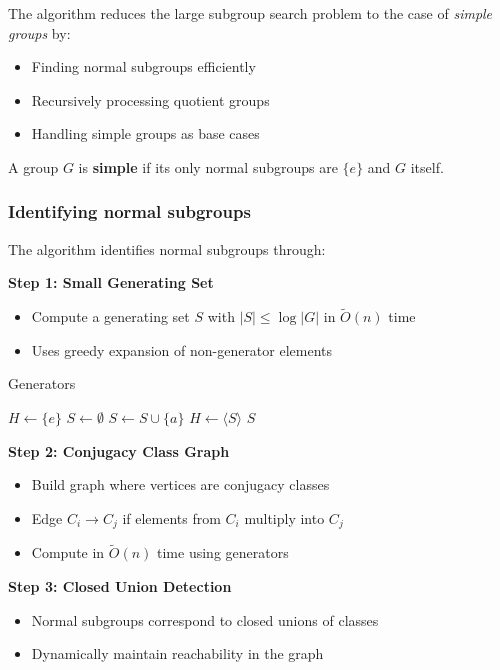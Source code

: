 \documentclass[sigconf]{acmart}
\begin{document}
The algorithm reduces the large subgroup search problem to the case of \emph{simple groups} by:
\begin{itemize}
    \item Finding normal subgroups efficiently
    \item Recursively processing quotient groups
    \item Handling simple groups as base cases
\end{itemize}

\begin{definition}
A group \( G \) is \textbf{simple} if its only normal subgroups are \( \{e\} \) and \( G \) itself.
\end{definition}

\subsubsection{Identifying normal subgroups}
The algorithm identifies normal subgroups through:

\textbf{Step 1: Small Generating Set}
\begin{itemize}
    \item Compute a generating set \( S \) with \( |S| \leq \log|G| \) in \( \widetilde{O}(n) \) time
    \item Uses greedy expansion of non-generator elements
\end{itemize}

\begin{algorithm}[H]
\caption{Generators}
\begin{algorithmic}[1]
\STATE \( H \gets \{e\} \)
\STATE \( S \gets \emptyset \)
        \STATE \( S \gets S \cup \{a\} \)
        \STATE \( H \gets \langle S \rangle \)
    \ENDIF
\ENDFOR
\RETURN \( S \)
\end{algorithmic}
\end{algorithm}

\textbf{Step 2: Conjugacy Class Graph}
\begin{itemize}
    \item Build graph where vertices are conjugacy classes
    \item Edge \( C_i \to C_j \) if elements from \( C_i \) multiply into \( C_j \)
    \item Compute in \( \widetilde{O}(n) \) time using generators
\end{itemize}

\textbf{Step 3: Closed Union Detection}
\begin{itemize}
    \item Normal subgroups correspond to closed unions of classes
    \item Dynamically maintain reachability in the graph
\end{itemize}
\end{document}
